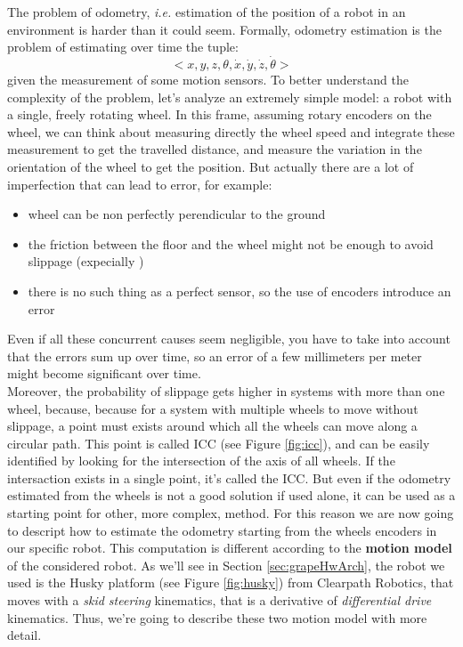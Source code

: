 The problem of odometry, \textit{i.e.} estimation of the position of a robot in an environment is harder than it could seem. Formally, odometry estimation is the problem of estimating over time the tuple: 
\begin{equation}
	<x, y, z, \theta,\dot{x}, \dot{y}, \dot{z}, \dot{\theta}>
	\label{eq:odometryTuple}
\end{equation} 
given the measurement of some motion sensors. 
To better understand the complexity of the problem, let's analyze an extremely simple model: a robot with a single, freely rotating wheel. In this frame, assuming rotary encoders on the wheel, we can think about measuring directly the wheel speed and integrate these measurement to get the travelled distance, and measure the variation in the orientation of the wheel to get the position. But actually there are a lot of imperfection that can lead to error, for example:
	\begin{itemize}
		\item wheel can be non perfectly perendicular to the ground
		\item the friction between the floor and the wheel might not be enough to avoid slippage (expecially )
		\item there is no such thing as a perfect sensor, so the use of encoders introduce an error
	\end{itemize}
Even if all these concurrent causes seem negligible, you have to take into account that the errors sum up over time, so an error of a few millimeters per meter might become significant over time. \\ 
Moreover, the probability of slippage gets higher in systems with more than one wheel, because, because for a system with multiple wheels to move without slippage, a point must exists around which all the wheels can move along a circular path. This point is called \ac{ICC} (see Figure \ref{fig:icc}), and can be easily identified by looking for the intersection of the axis of all wheels. If the intersaction exists in a single point, it's called the \ac{ICC}.
But even if the odometry estimated from the wheels is not a good solution if used alone, it can be used as a starting point for other, more complex, method. For this reason we are now going to descript how to estimate the odometry starting from the wheels encoders in our specific robot. This computation is different according to the \textbf{motion model} of the considered robot. As we'll see in Section \ref{sec:grapeHwArch}, the robot we used is the Husky platform (see Figure \ref{fig:husky}) from Clearpath Robotics, that moves with a  \textit{skid steering} kinematics, that is a derivative of \textit{differential drive} kinematics. Thus, we're going to describe these two motion model with more detail.


